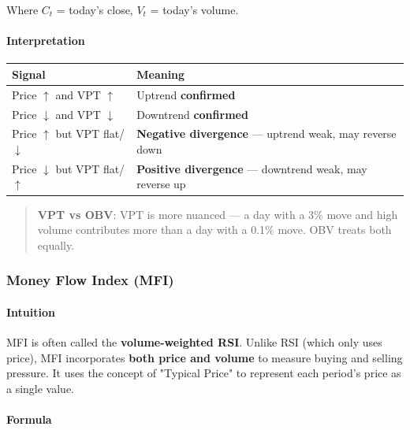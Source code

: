 \documentclass[12pt,openany]{book}
\begin{document}
Where \(C_t\) = today's close, \(V_t\) = today's volume.

\paragraph{Interpretation}

\begin{center}
\small
\renewcommand{\arraystretch}{1.2}
\begin{tabular}{|L{0.30\textwidth}|L{0.60\textwidth}|}
\hline
 \textbf{Signal} & \textbf{Meaning} \\ \hline
 Price \(\uparrow\) and VPT \(\uparrow\) & Uptrend \textbf{confirmed} \\ \hline
 Price \(\downarrow\) and VPT \(\downarrow\) & Downtrend \textbf{confirmed} \\ \hline
 Price \(\uparrow\) but VPT flat/\(\downarrow\) & \textbf{Negative divergence} --- uptrend weak, may reverse down \\ \hline
 Price \(\downarrow\) but VPT flat/\(\uparrow\) & \textbf{Positive divergence} --- downtrend weak, may reverse up \\ \hline
\end{tabular}
\end{center}

\begin{quote}
\textbf{VPT vs OBV}: VPT is more nuanced --- a day with a 3\% move and high volume contributes more than a day with a 0.1\% move. OBV treats both equally.

\end{quote}

\subsubsection{Money Flow Index (MFI)}

\paragraph{Intuition}
MFI is often called the \textbf{volume-weighted RSI}. Unlike RSI (which only uses price), MFI incorporates \textbf{both price and volume} to measure buying and selling pressure. It uses the concept of "Typical Price" to represent each period's price as a single value.

\paragraph{Formula}
\end{document}
